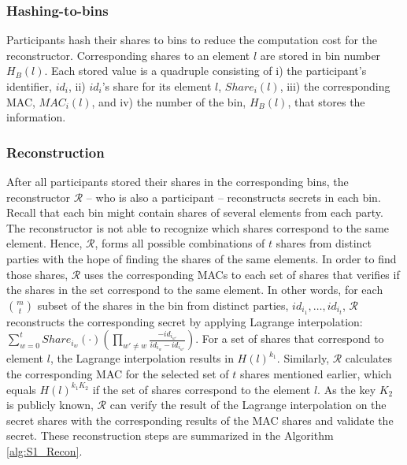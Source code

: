 \subsubsection{Hashing-to-bins}\label{Binning_S1}
Participants hash their shares to bins to reduce the computation cost for the reconstructor. Corresponding shares to an element $l$ are stored in bin number $H_B(l)$. Each stored value is a quadruple consisting of i) the participant's identifier, $id_i$, ii) $id_i$'s share for its element $l$, $Share_i(l)$, iii) the corresponding MAC, $MAC_i(l)$, and iv) the number of the bin, $H_B(l)$, that stores the information.

\subsubsection{Reconstruction}\label{Recon_S1}
After all participants stored their shares in the corresponding bins, the reconstructor  $\mathcal{R}$ -- who is also a participant -- reconstructs secrets in each bin. Recall that each bin might contain shares of several elements from each party. The reconstructor is not able to recognize which shares correspond to the same element. Hence, $\mathcal{R}$, forms all possible combinations of $t$ shares from distinct parties with the hope of finding the shares of the same elements. In order to find those shares, $\mathcal{R}$ uses the corresponding MACs to each set of shares that verifies if the shares in the set correspond to the same element. In other words, for each $m \choose t$ subset of the shares in the bin from distinct parties, $id_{i_1}, \dots, id_{i_t}$, $\mathcal{R}$ reconstructs the corresponding secret by applying Lagrange interpolation: $\sum^t_{w=0} Share_{i_w}(\cdot)(\prod_{w' \neq w} \frac{-id_{i_{w'}}}{id_{i_w} - id_{i_{w'}}})$. For a set of shares that correspond to element $l$, the Lagrange interpolation results in $H(l)^{k_1}$. Similarly, $\mathcal{R}$ calculates the corresponding MAC for the selected set of $t$ shares mentioned earlier, which equals $H(l)^{k_1 K_2}$ if the set of shares correspond to the element $l$. As the key $K_2$ is publicly known, $\mathcal{R}$ can verify the result of the Lagrange interpolation on the secret shares with the corresponding results of the MAC shares and validate the secret. These reconstruction steps are summarized in the Algorithm \ref{alg:S1_Recon}. 

